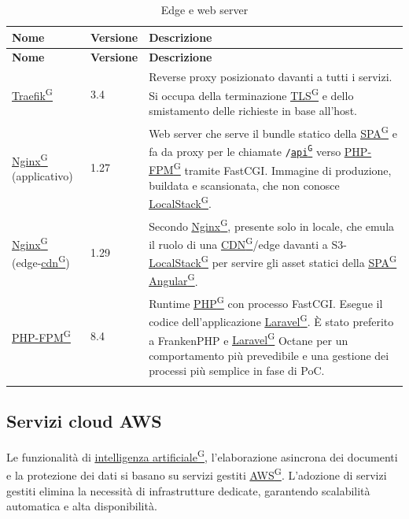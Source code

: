 \documentclass[a4paper,12pt]{article}
\providecommand{\glslink}[2]{\href{https://alittlebyte-19.github.io/Documentazione/glossario.html\#gls-#1}{\underline{#2}\textsuperscript{\scriptsize G}}}
\begin{document}
\renewcommand{\arraystretch}{1.3}
{\small
\setlength{\LTleft}{0pt}
\setlength{\LTright}{0pt}
\begin{longtable}{|p{3cm}|p{1.8cm}|p{9.7cm}|}
    \hline
    \rowcolor{gray!20}
    \textbf{Nome} & \textbf{Versione} & \textbf{Descrizione} \\
    \hline
    \endfirsthead
    \hline
    \rowcolor{gray!20}
    \textbf{Nome} & \textbf{Versione} & \textbf{Descrizione} \\
    \hline
    \endhead
    \glslink{traefik}{Traefik} & 3.4 & Reverse proxy posizionato davanti a tutti i servizi. Si occupa della terminazione \glslink{tls-transport-layer-security}{TLS} e dello smistamento delle richieste in base all'host. \\
    \hline
    \glslink{nginx}{Nginx} (applicativo) & 1.27 & Web server che serve il bundle statico della \glslink{spa-single-page-application}{SPA} e fa da proxy per le chiamate \texttt{/\glslink{api-application-programming-interface}{api}} verso \glslink{php-fpm}{PHP-FPM} tramite FastCGI. Immagine di produzione, buildata e scansionata, che non conosce \glslink{localstack}{LocalStack}. \\
    \hline
    \glslink{nginx}{Nginx} (edge-\glslink{cdn-content-delivery-network}{cdn}) & 1.29 & Secondo \glslink{nginx}{Nginx}, presente solo in locale, che emula il ruolo di una \glslink{cdn-content-delivery-network}{CDN}/edge davanti a S3-\glslink{localstack}{LocalStack} per servire gli asset statici della \glslink{spa-single-page-application}{SPA} \glslink{angular}{Angular}. \\
    \hline
    \glslink{php-fpm}{PHP-FPM} & 8.4 & Runtime \glslink{php}{PHP} con processo FastCGI. Esegue il codice dell'applicazione \glslink{laravel}{Laravel}. È stato preferito a FrankenPHP e \glslink{laravel}{Laravel} Octane per un comportamento più prevedibile e una gestione dei processi più semplice in fase di PoC. \\
    \hline
    \caption{Edge e web server}
\end{longtable}
}

\subsection{Servizi cloud AWS}

Le funzionalità di \glslink{intelligenza-artificiale-ai}{intelligenza artificiale}, l'elaborazione asincrona dei documenti e la protezione dei dati si basano su servizi gestiti \glslink{aws}{AWS}. L'adozione di servizi gestiti elimina la necessità di infrastrutture dedicate, garantendo scalabilità automatica e alta disponibilità.
\end{document}
